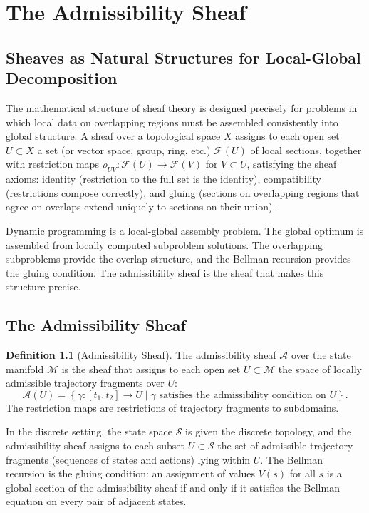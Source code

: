 \documentclass[12pt, a4paper, openany]{book}
\theoremstyle{plain}
\theoremstyle{definition}
\newtheorem{definition}[theorem]{Definition}
\theoremstyle{remark}
\begin{document}
\chapter{The Admissibility Sheaf}

\section{Sheaves as Natural Structures for Local-Global Decomposition}

The mathematical structure of sheaf theory is designed precisely for problems in which local data on overlapping regions must be assembled consistently into global structure. A sheaf over a topological space $X$ assigns to each open set $U \subset X$ a set (or vector space, group, ring, etc.) $\mathcal{F}(U)$ of local sections, together with restriction maps $\rho_{UV}: \mathcal{F}(U) \to \mathcal{F}(V)$ for $V \subset U$, satisfying the sheaf axioms: identity (restriction to the full set is the identity), compatibility (restrictions compose correctly), and gluing (sections on overlapping regions that agree on overlaps extend uniquely to sections on their union).

Dynamic programming is a local-global assembly problem. The global optimum is assembled from locally computed subproblem solutions. The overlapping subproblems provide the overlap structure, and the Bellman recursion provides the gluing condition. The admissibility sheaf is the sheaf that makes this structure precise.

\section{The Admissibility Sheaf}

\begin{definition}[Admissibility Sheaf]
The admissibility sheaf $\mathcal{A}$ over the state manifold $\mathcal{M}$ is the sheaf that assigns to each open set $U \subset \mathcal{M}$ the space of locally admissible trajectory fragments over $U$:
\[
\mathcal{A}(U) = \left\{\gamma: [t_1, t_2] \to U \;\Big|\; \gamma \text{ satisfies the admissibility condition on } U\right\}.
\]
The restriction maps are restrictions of trajectory fragments to subdomains.
\end{definition}

In the discrete setting, the state space $\mathcal{S}$ is given the discrete topology, and the admissibility sheaf assigns to each subset $U \subset \mathcal{S}$ the set of admissible trajectory fragments (sequences of states and actions) lying within $U$. The Bellman recursion is the gluing condition: an assignment of values $V(s)$ for all $s$ is a global section of the admissibility sheaf if and only if it satisfies the Bellman equation on every pair of adjacent states.
\end{document}
